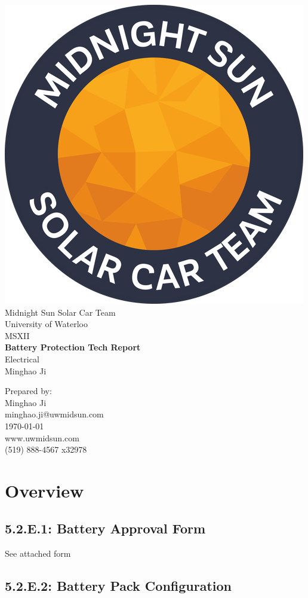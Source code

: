 \documentclass[10pt]{article}
\makeatletter
\newcommand\theteamname{Midnight Sun Solar Car Team} %
\newcommand\theuniversityname{University of Waterloo} %
\newcommand\theteamwebsite{www.uwmidsun.com} %
\newcommand\theteamphone{(519) 888-4567 x32978} %
\newcommand\thetitle{Battery Protection Tech Report} %
\newcommand\thesubtitle{Electrical} %
\newcommand\theauthor{Minghao Ji} %
\newcommand\theauthorcontact{minghao.ji@uwmidsun.com} %
\newcommand\thedate{\today} %
\makeatother
\begin{document}
\begin{titlepage}
\large
\vspace*{2cm}
\centering
\includegraphics[width=.25\textwidth]{./figures/midnightSunLogoCircle.png} \\
\vspace{1.5cm}
{\LARGE \theteamname} \\
\theuniversityname \\
\vspace{2.2cm}
{\LARGE MSXII} \\
\vspace{0.4cm}
{\huge\bfseries \thetitle} \\
\vspace{0.2cm}
{\LARGE \thesubtitle} \\
\vspace{2.2cm}
\ifdefined \theauthor
\par Prepared by: \\
\theauthor \\
\theauthorcontact \\
\fi
\thedate \\
\vfill
\theteamwebsite \\
\theteamphone
\end{titlepage}

\tableofcontents
\newpage

\section{Overview}

\subsection{5.2.E.1: Battery Approval Form}

See attached form



\subsection{5.2.E.2: Battery Pack Configuration}
\end{document}
